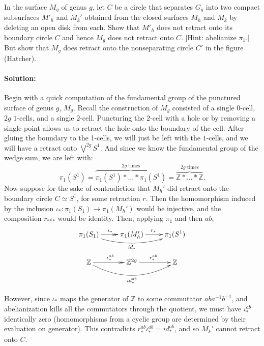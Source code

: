 \documentclass{article}
\begin{document}
\begin{exe}
    
    In the surface $M_g$ of genus $g$, let $C$ be a circle that separates $G_g$ into two compact subsurfaces $M'_h$ and $M_k'$ obtained from the closed surfaces $M_h$ and $M_k$ by deleting an open disk from each. Show that $M'_h$ does not retract onto its boundary circle $C$ and hence $M_g$ does not retract onto $C$. [Hint: abelianize $\pi_1$.] But show that $M_g$ does retract onto the nonseparating circle $C'$ in the figure (Hatcher).
\end{exe}
\paragraph{Solution: }


Begin with a quick computation of the fundamental group of the punctured surface of genus $g$, $M_g$. Recall the construction of $M_g$ consisted of a single $0$-cell, $2g$ $1$-cells, and a single $2$-cell. Puncturing the $2$-cell with a hole or by removing a single point allows us to retract the hole onto the boundary of the cell. After gluing the boundary to the 1-cells, we will just be left with the $1$-cells, and we will have a retract onto $\bigvee^{2g}S^{1}$. And since we know the fundamental group of the wedge sum, we are left with: \[
    \pi_1(S^{1})=\overbrace{\pi_1(S^{1})*\dots*\pi_1(S^{1})}^{2g\text{ times}}=\overbrace{\mathbb{Z}*\dots* \mathbb{Z} }^{2g\text{ times}}
.\] 
Now suppose for the sake of contradiction that $M_h'$ did retract onto the boundary circle $C\simeq S^{1}$, for some retraction $r$. Then the homomorphism induced by the inclusion $\iota_*:\pi_1(S_1)\to \pi_1(M_h')$ would be injective, and the composition $r_*\iota_*$ would be identity. Then, applying $\pi_1$ and then $ab$,
\[\xymatrix{
        \pi_1(S_1)\ar@/_1pc/[rr]_{id_*}\ar@{->>}[r]^{\iota_*}&\pi_1(M_h')\ar@{->}[r]^{r_*}&\pi_1(S^{1})\\
    \mathbb{Z}\ar@/_1.5pc/[rr]_{id_*^{ab}}\ar@{->>}[r]^{\iota_*^{ab}}&\mathbb{Z}^{2g} \ar@{->}[r]^{r_*^{ab}}&\mathbb{Z}
}\]

However, since $\iota_*$ maps the generator of $\mathbb{Z}$ to some commutator $aba^{-1}b^{-1}$, and abelianization kills all the commutators through the quotient, we must have $\iota_*^{ab}$ identically zero (homomorphisms from a cyclic group are determined by their evaluation on generator). This contradicts $r_*^{ab}\iota_*^{ab}=id_*^{ab}$, and so $M_k'$ cannot retract onto $C$.
\end{document}
